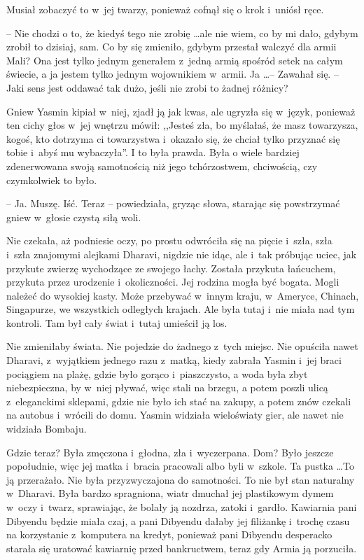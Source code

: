 \documentclass[oneside,polish,11pt,rmheadings]{mwbk}
\begin{document}
Musiał zobaczyć to w~jej twarzy, ponieważ cofnął się o krok i~uniósł ręce. 

-- Nie chodzi o to, że kiedyś tego nie zrobię \ldots  ale nie wiem, co by mi dało, gdybym zrobił to dzisiaj, sam. Co by się zmieniło, gdybym przestał walczyć dla armii Mali? Ona jest tylko jednym generałem z~jedną armią spośród setek na całym świecie, a ja jestem tylko jednym wojownikiem w~armii. Ja \ldots  -- Zawahał się. -- Jaki sens jest oddawać tak dużo, jeśli nie zrobi to żadnej różnicy?

Gniew Yasmin kipiał w~niej, zjadł ją jak kwas, ale ugryzła się w~język, ponieważ ten cichy głos w~jej wnętrzu mówił: ,,Jesteś zła, bo myślałaś, że masz towarzysza, kogoś, kto dotrzyma ci towarzystwa i~okazało się, że chciał tylko przyznać się tobie i~abyś mu wybaczyła''. I to była prawda. Była o wiele bardziej zdenerwowana swoją samotnością niż jego tchórzostwem, chciwością, czy czymkolwiek to było.

-- Ja. Muszę. Iść. Teraz -- powiedziała, gryząc słowa, starając się powstrzymać gniew w~głosie czystą siłą woli.

Nie czekała, aż podniesie oczy, po prostu odwróciła się na pięcie i~szła, szła i~szła znajomymi alejkami Dharavi, nigdzie nie idąc, ale i~tak próbując uciec, jak przykute zwierzę wychodzące ze swojego łachy. Została przykuta łańcuchem, przykuta przez urodzenie i~okoliczności. Jej rodzina mogła być bogata. Mogli należeć do wysokiej kasty. Może przebywać w~innym kraju, w~Ameryce, Chinach, Singapurze, we wszystkich odległych krajach. Ale była tutaj i~nie miała nad tym kontroli. Tam był cały świat i~tutaj umieścił ją los.

Nie zmieniłaby świata. Nie pojedzie do żadnego z~tych miejsc. Nie opuściła nawet Dharavi, z~wyjątkiem jednego razu z~matką, kiedy zabrała Yasmin i~jej braci pociągiem na plażę, gdzie było gorąco i~piaszczysto, a woda była zbyt niebezpieczna, by w~niej pływać, więc stali na brzegu, a potem poszli ulicą z~eleganckimi sklepami, gdzie nie było ich stać na zakupy, a potem znów czekali na autobus i~wrócili do domu. Yasmin widziała wieloświaty gier, ale nawet nie widziała Bombaju.

Gdzie teraz? Była zmęczona i~głodna, zła i~wyczerpana. Dom? Było jeszcze popołudnie, więc jej matka i~bracia pracowali albo byli w~szkole. Ta pustka \ldots  To ją przerażało. Nie była przyzwyczajona do samotności. To nie był stan naturalny w~Dharavi. Była bardzo spragniona, wiatr dmuchał jej plastikowym dymem w~oczy i~twarz, sprawiając, że bolały ją nozdrza, zatoki i~gardło. Kawiarnia pani Dibyendu będzie miała czaj, a pani Dibyendu dałaby jej filiżankę i~trochę czasu na korzystanie z~komputera na kredyt, ponieważ pani Dibyendu desperacko starała się uratować kawiarnię przed bankructwem, teraz gdy Armia ją porzuciła.
\end{document}

